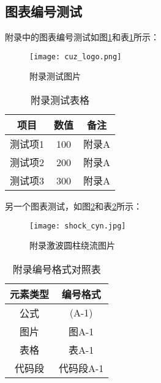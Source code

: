 \begin{appendices}
    \subsection{图表编号测试} \label{subsec:testfigures}

    附录中的图表编号测试如图\ref{fig:appendix-test}和表\ref{tab:appendix-test}所示：

    \begin{figure}[htbp]
        \centering
        \texttt{[image: cuz\_logo.png]}
        \caption{附录测试图片}
        \label{fig:appendix-test}
    \end{figure}

    \begin{table}[htbp]
        \centering
        \caption{附录测试表格}
        \label{tab:appendix-test}
        \begin{tabular}{ccc}
            \toprule
            项目 & 数值 & 备注 \\
            \midrule
            测试项1 & 100 & 附录A \\
            测试项2 & 200 & 附录A \\
            测试项3 & 300 & 附录A \\
            \bottomrule
        \end{tabular}
    \end{table}

    另一个图表测试，如图\ref{fig:appendix-test-2}和表\ref{tab:appendix-test-2}所示：

    \begin{figure}[htbp]
        \centering
        \texttt{[image: shock\_cyn.jpg]}
        \caption{附录激波圆柱绕流图片}
        \label{fig:appendix-test-2}
    \end{figure}

    \begin{table}[htbp]
        \centering
        \caption{附录编号格式对照表}
        \label{tab:appendix-test-2}
        \begin{tabular}{cc}
            \toprule
            元素类型 & 编号格式 \\
            \midrule
            公式 & (A-1) \\
            图片 & 图A-1 \\
            表格 & 表A-1 \\
            代码段 & 代码段A-1 \\
            \bottomrule
        \end{tabular}
    \end{table}


\end{appendices}
